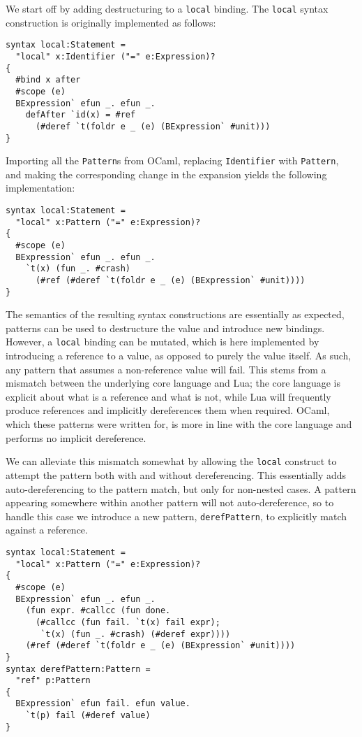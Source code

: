 \documentclass{kththesis}
\begin{document}
We start off by adding destructuring to a \texttt{local} binding. The \texttt{local} syntax construction is originally implemented as follows:

\begin{verbatim}
syntax local:Statement =
  "local" x:Identifier ("=" e:Expression)?
{
  #bind x after
  #scope (e)
  BExpression` efun _. efun _.
    defAfter `id(x) = #ref
      (#deref `t(foldr e _ (e) (BExpression` #unit)))
}
\end{verbatim}

Importing all the \texttt{Pattern}s from OCaml, replacing \texttt{Identifier} with \texttt{Pattern}, and making the corresponding change in the expansion yields the following implementation:

\begin{verbatim}
syntax local:Statement =
  "local" x:Pattern ("=" e:Expression)?
{
  #scope (e)
  BExpression` efun _. efun _.
    `t(x) (fun _. #crash)
      (#ref (#deref `t(foldr e _ (e) (BExpression` #unit))))
}
\end{verbatim}

The semantics of the resulting syntax constructions are essentially as expected, patterns can be used to destructure the value and introduce new bindings. However, a \texttt{local} binding can be mutated, which is here implemented by introducing a reference to a value, as opposed to purely the value itself. As such, any pattern that assumes a non-reference value will fail. This stems from a mismatch between the underlying core language and Lua; the core language is explicit about what is a reference and what is not, while Lua will frequently produce references and implicitly dereferences them when required. OCaml, which these patterns were written for, is more in line with the core language and performs no implicit dereference.

We can alleviate this mismatch somewhat by allowing the \texttt{local} construct to attempt the pattern both with and without dereferencing. This essentially adds auto-dereferencing to the pattern match, but only for non-nested cases. A pattern appearing somewhere within another pattern will not auto-dereference, so to handle this case we introduce a new pattern, \texttt{derefPattern}, to explicitly match against a reference.

\begin{verbatim}
syntax local:Statement =
  "local" x:Pattern ("=" e:Expression)?
{
  #scope (e)
  BExpression` efun _. efun _.
    (fun expr. #callcc (fun done.
      (#callcc (fun fail. `t(x) fail expr);
       `t(x) (fun _. #crash) (#deref expr))))
    (#ref (#deref `t(foldr e _ (e) (BExpression` #unit))))
}
syntax derefPattern:Pattern =
  "ref" p:Pattern
{
  BExpression` efun fail. efun value.
    `t(p) fail (#deref value)
}
\end{verbatim}
\end{document}
